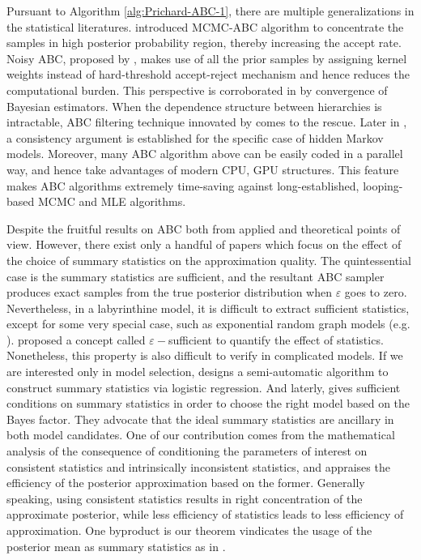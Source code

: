Pursuant to Algorithm \ref{alg:Prichard-ABC-1}, there are multiple
generalizations in the statistical literatures. \citet{marjoram2003markov}
{introduced } MCMC-ABC algorithm to concentrate the
samples in high posterior probability region, thereby increasing the
accept rate. Noisy ABC, proposed by \citet{wilkinson2013approximate},
makes use of all the prior samples by assigning kernel weights instead
of hard-threshold accept-reject mechanism and hence reduces the computational
burden. This perspective is corroborated in \citet{fearnhead2012constructing}
by convergence of Bayesian estimators. When the dependence structure
between hierarchies is intractable, ABC filtering technique innovated
by \citet{jasra2012filtering} comes to the rescue. Later in \citet{dean2014parameter},
a consistency argument is established for the specific case of hidden
Markov models. Moreover, many ABC algorithm above can be easily coded
in a parallel way, and hence take advantages of modern CPU, GPU structures.
This feature makes ABC algorithms extremely time-saving against long-established,
looping-based MCMC and MLE algorithms. 

Despite the fruitful results on ABC both from applied and theoretical
points of view. However, there exist only a handful of papers which
focus on the effect of the choice of summary statistics on the approximation
quality. The quintessential case is the summary statistics are sufficient,
and the resultant ABC sampler produces exact samples from the true
posterior distribution when $\varepsilon$ goes to zero. Nevertheless,
in a labyrinthine model, it is difficult to extract sufficient statistics,
except for some very special case, such as exponential random graph
models (e.g. \citet{grelaud2009abc}). \citet{joyce2008approximately}
proposed a concept called $\varepsilon-$sufficient to quantify the
effect of statistics. Nonetheless, this property is also difficult
to verify in complicated models. If we are interested only in model
selection, \citet{prangle2014semi} designs a semi-automatic algorithm
to construct summary statistics via logistic regression. And laterly,
\citet{marin2014relevant} gives sufficient conditions on summary
statistics in order to choose the right model based on the Bayes factor.
They advocate that the ideal summary statistics are ancillary in both
model candidates. One of our contribution comes from the mathematical
analysis of the consequence of conditioning the parameters of interest
on consistent statistics and intrinsically inconsistent statistics,
and appraises the efficiency of the posterior approximation based
on the former. Generally speaking, using consistent statistics results
in right concentration of the approximate posterior, while less efficiency
of statistics leads to less efficiency of approximation. One byproduct
is our theorem vindicates the usage of the posterior mean as summary
statistics as in \citet{fearnhead2012constructing}. 

